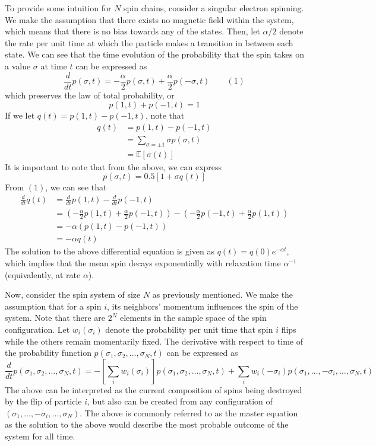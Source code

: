 \documentclass[12pt]{article}
\newcommand{\E}{\mathbb{E}}
\theoremstyle{definition}
\theoremstyle{remark}
\begin{document}
To provide some intuition for $N$ spin chains, consider a singular electron spinning. We make the assumption that there exists no magnetic field within the system, which means that there is no bias towards any of the states. Then, let $\alpha /2 $ denote the rate per unit time at which the particle makes a transition in between each state. We can see that the time evolution of the probability that the spin takes on a value $\sigma$ at time $t$ can be expressed as
\[
\frac{d}{dt} p(\sigma,t) = -\frac{\alpha}{2}p(\sigma, t) + \frac{\alpha}{2}p(-\sigma, t) \qquad (1)
\]
which preserves the law of total probability, or
\[
p(1,t) + p(-1,t) = 1
\]
If we let $q(t) = p(1,t) - p(-1,t)$, note that 
\begin{align*}
    q(t) &= p(1,t) - p(-1,t)\\
    &= \sum_{\sigma = \pm 1}\sigma p(\sigma,t) \\
    &= \E[\sigma(t)]
\end{align*}
It is important to note that from the above, we can express 
\[
p(\sigma, t) = 0.5[1 + \sigma q(t)]
\]
From $(1)$, we can see that 
\begin{align*}
\frac{d}{dt} q(t) &= \frac{d}{dt} p(1,t) - \frac{d}{dt}p(-1,t) \\
&= \left(-\frac{\alpha}{2}p(1, t) + \frac{\alpha}{2}p(-1, t)\right)  - \left(-\frac{\alpha}{2}p(-1, t) + \frac{\alpha}{2}p(1, t)\right)\\
&= -\alpha (p(1,t) - p(-1,t))\\
&= -\alpha q(t)
\end{align*}
The solution to the above differential equation is given as $q(t) = q(0)e^{-\alpha t}$, which implies that the mean spin decays exponentially with relaxation time $\alpha^{-1}$ (equivalently, at rate $\alpha$).

Now, consider the spin system of size $N$ as previously mentioned. We make the assumption that for a spin $i$, its neighbors' momentum influences the spin of the system. Note that there are $2^N$ elements in the sample space of the spin configuration. Let $w_i(\sigma_i)$ denote the probability per unit time that spin $i$ flips while the others remain momentarily fixed. The derivative with respect to time of the probability function $p(\sigma_1, \sigma_2, \dots, \sigma_N, t)$ can be expressed as
\[
\frac{d}{dt} p(\sigma_1, \sigma_2, \dots, \sigma_N, t) = - \left[ \sum_i w_i(\sigma_i)\right]p(\sigma_1, \sigma_2, \dots, \sigma_N, t) + \sum_i w_i(-\sigma_i) p(\sigma_1, \dots, -\sigma_i,\dots,  \sigma_N, t) 
\]
The above can be interpreted as the current composition of spins being destroyed by the flip of particle $i$, but also can be created from any configuration of $(\sigma_1, \dots, -\sigma_i, \dots, \sigma_N)$. The above is commonly referred to as the master equation as the solution to the above would describe the most probable outcome of the system for all time. 
\end{document}
